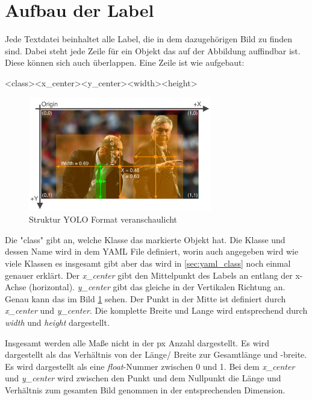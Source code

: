 \section{Aufbau der Label}
Jede Textdatei beinhaltet alle Label, die in dem dazugehörigen Bild zu finden sind. Dabei steht jede Zeile für ein Objekt das auf der Abbildung auffindbar ist. Diese können sich auch überlappen. Eine Zeile ist wie aufgebaut:
\begin{tcolorbox}
    \textless class\textgreater\space \textless x\_center\textgreater \space \textless y\_center\textgreater \space\textless width\textgreater \space\textless height\textgreater 
\end{tcolorbox}
\begin{figure}
    \begin{center}
        \includegraphics[width=8cm]{data/img/yolo_picture_structure.png}    
        \caption{Struktur YOLO Format veranschaulicht}
        \label{fig:yoloFormat}
    \end{center}
\end{figure}
Die "class" gibt an, welche Klasse das markierte Objekt hat. Die Klasse und dessen Name wird in dem YAML File definiert, worin auch angegeben wird wie viele Klassen es insgesamt gibt aber das wird in \ref{sec:yaml_class} noch einmal genauer erklärt. Der \textit{x\_center} gibt den Mittelpunkt des Labels an entlang der x-Achse (horizontal). \textit{y\_center} gibt das gleiche in der Vertikalen Richtung an. Genau kann das im Bild \ref{fig:yoloFormat} sehen. Der Punkt in der Mitte ist definiert durch \textit{x\_center} und \textit{y\_center}. Die komplette Breite und Lange wird entsprechend durch \textit{width} und \textit{height} dargestellt. 

Insgesamt werden alle Maße nicht in der px Anzahl dargestellt. Es wird dargestellt als das Verhältnis von der Länge/ Breite zur Gesamtlänge und -breite. Es wird dargestellt als eine \textit{float}-Nummer zwischen 0 und 1. Bei dem \textit{x\_center} und \textit{y\_center} wird zwischen den Punkt und dem Nullpunkt die Länge und Verhältnis zum gesamten Bild genommen in der entsprechenden Dimension. 

